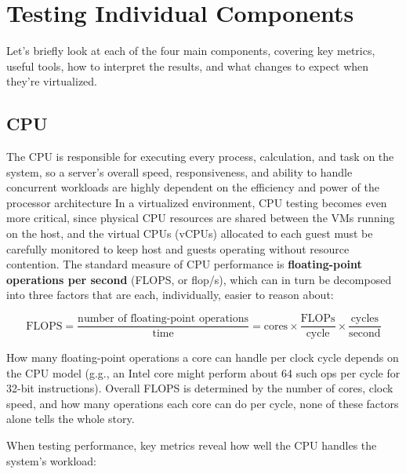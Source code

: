 \section{Testing Individual Components} \label{sec:component_tests}

Let's briefly look at each of the four main components, covering key metrics, useful tools, how to interpret the results, and what changes to expect when they're virtualized.

\vspace{-0.5em}

\subsection{CPU} \label{subsec:cpu_testing}

The CPU is responsible for executing every process, calculation, and task on the system, so a server's overall speed, responsiveness, and ability to handle concurrent workloads are highly dependent on the efficiency and power of the processor architecture In a virtualized environment, CPU testing becomes even more critical, since physical CPU resources are shared between the VMs running on the host, and the virtual CPUs (vCPUs) allocated to each guest must be carefully monitored to keep host and guests operating without resource contention. The standard measure of CPU performance is \textbf{floating-point operations per second} (FLOPS, or flop/s), which can in turn be decomposed into three factors that are each, individually, easier to reason about:

\vspace{-0.5em}

$$
\text{FLOPS} = \frac{\text{number of floating-point operations}}{\text{time}} = \text{cores} \times \frac{\text{FLOPs}}{\text{cycle}} \times \frac{\text{cycles}}{\text{second}}
$$

How many floating-point operations a core can handle per clock cycle depends on the CPU model (g.g., an Intel core might perform about 64 such ops per cycle for 32-bit instructions). Overall FLOPS is determined by the number of cores, clock speed, and how many operations each core can do per cycle, none of these factors alone tells the whole story. 

When testing performance, key metrics reveal how well the CPU handles the system's workload:

